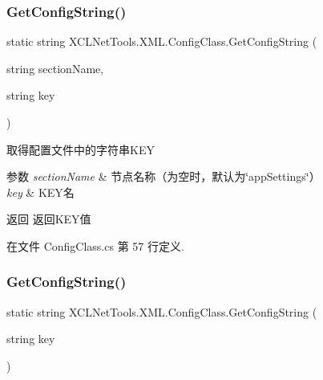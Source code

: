 \subsubsection{\texorpdfstring{Get\+Config\+String()}{GetConfigString()}\hspace{0.1cm}{\footnotesize\ttfamily [1/2]}}
{\footnotesize\ttfamily static string X\+C\+L\+Net\+Tools.\+X\+M\+L.\+Config\+Class.\+Get\+Config\+String (\begin{DoxyParamCaption}\item[{string}]{section\+Name,  }\item[{string}]{key }\end{DoxyParamCaption})\hspace{0.3cm}{\ttfamily [static]}}



取得配置文件中的字符串\+K\+EY 


\begin{DoxyParams}{参数}
{\em section\+Name} & 节点名称（为空时，默认为\char`\"{}app\+Settings\char`\"{}）\\
\hline
{\em key} & K\+E\+Y名\\
\hline
\end{DoxyParams}
\begin{DoxyReturn}{返回}
返回\+K\+E\+Y值
\end{DoxyReturn}


在文件 Config\+Class.\+cs 第 57 行定义.

\mbox{\label{class_x_c_l_net_tools_1_1_x_m_l_1_1_config_class_aceec5701515f9c2fdddcdc1c819b4dc3}} 
\subsubsection{\texorpdfstring{Get\+Config\+String()}{GetConfigString()}\hspace{0.1cm}{\footnotesize\ttfamily [2/2]}}
{\footnotesize\ttfamily static string X\+C\+L\+Net\+Tools.\+X\+M\+L.\+Config\+Class.\+Get\+Config\+String (\begin{DoxyParamCaption}\item[{string}]{key }\end{DoxyParamCaption})\hspace{0.3cm}{\ttfamily [static]}}



